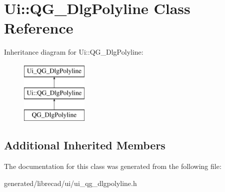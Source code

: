 \hypertarget{classUi_1_1QG__DlgPolyline}{\section{Ui\-:\-:Q\-G\-\_\-\-Dlg\-Polyline Class Reference}
\label{classUi_1_1QG__DlgPolyline}
}
Inheritance diagram for Ui\-:\-:Q\-G\-\_\-\-Dlg\-Polyline\-:\begin{figure}[H]
\begin{center}
\leavevmode
\includegraphics[height=3.000000cm]{classUi_1_1QG__DlgPolyline}
\end{center}
\end{figure}
\subsection*{Additional Inherited Members}


The documentation for this class was generated from the following file\-:\begin{DoxyCompactItemize}
\item 
generated/librecad/ui/ui\-\_\-qg\-\_\-dlgpolyline.\-h\end{DoxyCompactItemize}
